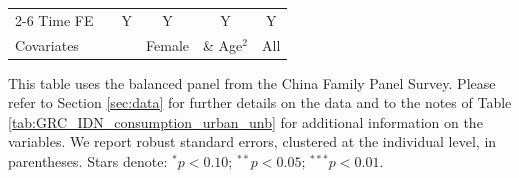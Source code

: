 \begin{table}[htbp]
\begin{threeparttable}
\begin{tabular}{l ccccc}
\cmidrule{2-6} Time FE & & Y & Y & Y & Y \\ Covariates & & & Female & \& Age$^2$ & All \\ \bottomrule \end{tabular} \begin{tablenotes}[flushleft] \footnotesize \item{This table uses the balanced panel from the China Family Panel Survey. Please refer to Section \ref{sec:data} for further details on the data and to the notes of Table \ref{tab:GRC_IDN_consumption_urban_unb} for additional information on the variables. We report robust standard errors, clustered at the individual level, in parentheses. Stars denote: $^{*} p<0.10$; $^{**} p<0.05$; $^{***} p<0.01$.} \end{tablenotes} \end{threeparttable} \end{table}
